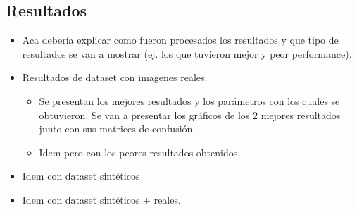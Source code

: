 \subsection{Resultados}
	\begin{itemize}
		\item Aca debería explicar como fueron procesados los resultados y que tipo de resultados se van a mostrar (ej. los que tuvieron mejor y peor performance).
		\item Resultados de dataset con imagenes reales.
		\begin{itemize}
			\item Se presentan los mejores resultados y los parámetros con los cuales se obtuvieron. Se van a presentar los gráficos de los 2 mejores resultados junto con sus matrices de confusión.
			\item Idem pero con los peores resultados obtenidos.
		\end{itemize}
		\item Idem con dataset sintéticos
		\item Idem con dataset sintéticos + reales.

	\end{itemize}